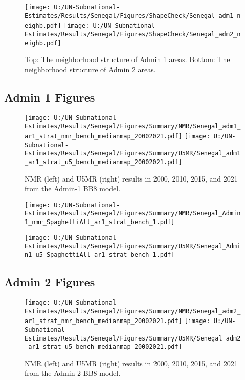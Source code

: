 \documentclass[
]{article}
\begin{document}
\begin{figure}[!h]
 \centering
\texttt{[image: U:/UN-Subnational-Estimates/Results/Senegal/Figures/ShapeCheck/Senegal\_adm1\_neighb.pdf]}
\texttt{[image: U:/UN-Subnational-Estimates/Results/Senegal/Figures/ShapeCheck/Senegal\_adm2\_neighb.pdf]}
\caption{Top: The neighborhood structure of Admin 1 areas. Bottom: The neighborhood structure of Admin 2 areas.}
\end{figure}

\hypertarget{admin-1-figures}{%
\subsection{Admin 1 Figures}\label{admin-1-figures}}

\begin{figure}[!h]
 \centering
\texttt{[image: U:/UN-Subnational-Estimates/Results/Senegal/Figures/Summary/NMR/Senegal\_adm1\_ar1\_strat\_nmr\_bench\_medianmap\_20002021.pdf]}
\texttt{[image: U:/UN-Subnational-Estimates/Results/Senegal/Figures/Summary/U5MR/Senegal\_adm1\_ar1\_strat\_u5\_bench\_medianmap\_20002021.pdf]}
\caption{NMR (left) and U5MR (right) results in 2000, 2010, 2015, and 2021 from the Admin-1 BB8 model.}
\end{figure}
\clearpage

\begin{figure}[!h]
 \centering
\texttt{[image: U:/UN-Subnational-Estimates/Results/Senegal/Figures/Summary/NMR/Senegal\_Admin1\_nmr\_SpaghettiAll\_ar1\_strat\_bench\_1.pdf]}
\end{figure}
\clearpage

\begin{figure}[!h]
 \centering
\texttt{[image: U:/UN-Subnational-Estimates/Results/Senegal/Figures/Summary/U5MR/Senegal\_Admin1\_u5\_SpaghettiAll\_ar1\_strat\_bench\_1.pdf]}
\end{figure}

\clearpage

\hypertarget{admin-2-figures}{%
\subsection{Admin 2 Figures}\label{admin-2-figures}}

\begin{figure}[!h]
 \centering
\texttt{[image: U:/UN-Subnational-Estimates/Results/Senegal/Figures/Summary/NMR/Senegal\_adm2\_ar1\_strat\_nmr\_bench\_medianmap\_20002021.pdf]}
\texttt{[image: U:/UN-Subnational-Estimates/Results/Senegal/Figures/Summary/U5MR/Senegal\_adm2\_ar1\_strat\_u5\_bench\_medianmap\_20002021.pdf]}
\caption{NMR (left) and U5MR (right) results in 2000, 2010, 2015, and 2021 from the Admin-2 BB8 model.}
\end{figure}
\clearpage
\end{document}
